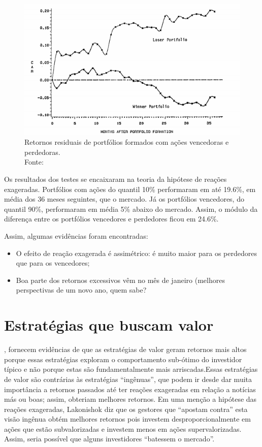 \begin{figure}[h]
	\centering
	\includegraphics[width=1\linewidth]{figs/fig_comp_winner}
	\caption[Retornos de portfólios vencedores e perdedores]{Retornos residuais de portfólios formados com ações vencedoras e perdedoras.\\ Fonte: }
	\label{fig:figcompwinner}
\end{figure}

Os resultados dos testes se encaixaram na teoria da hipótese de reações exageradas. Portfólios com ações do quantil 10\% performaram em até 19.6\%, em média dos 36 meses seguintes, que o mercado. Já os portfólios vencedores, do quantil 90\%, performaram em média 5\% abaixo do mercado. Assim, o módulo da diferença entre os portfólios vencedores e perdedores ficou em 24.6\%.

Assim, algumas evidências foram encontradas:

\begin{itemize}
	\item O efeito de reação exagerada é assimétrico: é muito maior para os perdedores que para os vencedores;
	\item Boa parte dos retornos excessivos vêm no mês de janeiro (melhores perspectivas de um novo ano, quem sabe?
\end{itemize}

\section{Estratégias que buscam valor}

, fornecem evidências de que as estratégias de valor geram retornos mais altos porque essas estratégias exploram o comportamento sub-ótimo do investidor típico e não porque estas são fundamentalmente mais arriscadas.Essas estratégias de valor são contrárias às estratégias “ingênuas”, que podem ir desde dar muita importância a retornos passados até ter reações exageradas em relação a notícias más ou boas; assim, obteriam melhores retornos.
Em uma menção a hipótese das reações exageradas, Lakonishok diz que os gestores que “apostam contra” esta visão ingênua obtém melhores retornos pois investem desproporcionalmente em ações que estão subvalorizadas e investem menos em ações supervalorizadas. Assim, seria possível que alguns investidores “batessem o mercado”.

